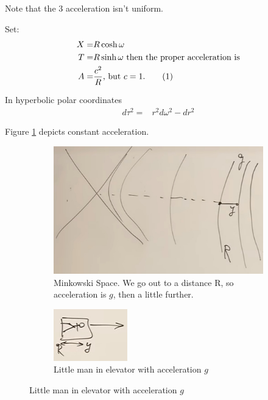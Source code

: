 \documentclass[]{article}
\newcommand\numberthis{\addtocounter{equation}{1}\tag{\theequation}}
\begin{document}
{Note that the 3 acceleration isn't uniform.

Set:
\begin{align*}
	X=& R \cosh \omega\\
	T=& R \sinh \omega \text{ then the proper acceleration is}\\
	A =& \frac{c^2}{R} \text{, but $c=1$.} \numberthis \label{eq:A:R}
\end{align*}

In hyperbolic polar coordinates
\begin{align*}
	d\tau^2 =& r^2 d \omega^2 - dr^2
\end{align*}

Figure \ref{fig:gr-4-constant-acceleration} depicts constant acceleration.
\begin{figure}[H]
	\begin{center}
		\caption{Constant Acceleration.}
		\begin{subfigure}[t]{0.65\textwidth}
			\caption{Minkowski Space. We go out to a distance R, so acceleration is $g$, then a little further.}\label{fig:gr-4-constant-acceleration}
			\includegraphics[width=\textwidth]{gr-4-constant-acceleration}
		\end{subfigure}
		\;
		\begin{subfigure}[t]{0.3\textwidth}
			\caption{Little man in elevator with acceleration $g$}\label{fig:gr-4-little-man}
			\includegraphics[width=\textwidth]{gr-4-little-man}
		\end{subfigure}
	\end{center}
\end{figure}

}
\end{document}
